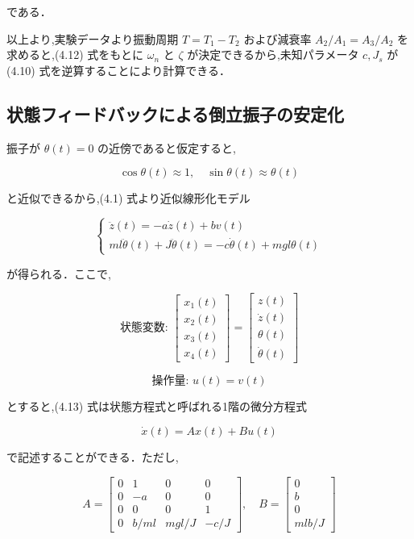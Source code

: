 である．

以上より,実験データより振動周期 \( T = T_1 - T_2 \) および減衰率 
\( A_2/A_1 = A_3/A_2 \) を求めると,(4.12) 式をもとに \( \omega_n \) と \( \zeta \) 
が決定できるから,未知パラメータ \( c, J_s \) が (4.10) 式を逆算することにより計算できる．

\subsection{状態フィードバックによる倒立振子の安定化}

振子が \( \theta(t) = 0 \) の近傍であると仮定すると,

\[
  \cos \theta(t) \approx 1, \quad \sin \theta(t) \approx \theta(t)
\]

と近似できるから,(4.1) 式より近似線形化モデル

\[
  \begin{cases}
    \ddot{z}(t) = -a\dot{z}(t) + bv(t) \\
    ml\ddot{\theta}(t) + J\ddot{\theta}(t) = -c\dot{\theta}(t) + mgl\theta(t)
  \end{cases} \tag{4.13}
\]

が得られる．ここで,


\[
  \text{状態変数: }
  \begin{bmatrix}
    x_1(t) \\
    x_2(t) \\
    x_3(t) \\
    x_4(t)
  \end{bmatrix}
  =
  \begin{bmatrix}
    z(t)       \\
    \dot{z}(t) \\
    \theta(t)  \\
    \dot{\theta}(t)
  \end{bmatrix}
\]

\[　\text{操作量: } u(t) = v(t) 　\]

とすると,(4.13) 式は状態方程式と呼ばれる1階の微分方程式

\[
  \dot{x}(t) = Ax(t) + Bu(t) \tag{4.14}
\]

で記述することができる．ただし,

\[
  A = \begin{bmatrix}
    0 & 1    & 0     & 0    \\
    0 & -a   & 0     & 0    \\
    0 & 0    & 0     & 1    \\
    0 & b/ml & mgl/J & -c/J
  \end{bmatrix}, \quad
  B = \begin{bmatrix}
    0 \\
    b \\
    0 \\
    mlb/J
  \end{bmatrix}
\]

